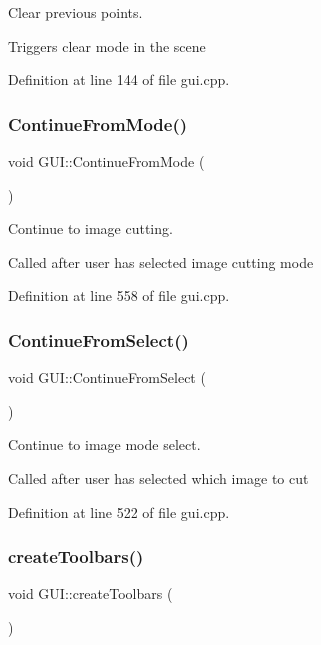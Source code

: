 Clear previous points. 

Triggers clear mode in the scene 

Definition at line 144 of file gui.\+cpp.

\mbox{\label{classGUI_a3547730e0fae81b59fcb19d00a370782}} 
\subsubsection{\texorpdfstring{Continue\+From\+Mode()}{ContinueFromMode()}}
{\footnotesize\ttfamily void G\+U\+I\+::\+Continue\+From\+Mode (\begin{DoxyParamCaption}{ }\end{DoxyParamCaption})}



Continue to image cutting. 

Called after user has selected image cutting mode 

Definition at line 558 of file gui.\+cpp.

\mbox{\label{classGUI_a0cddf3859f457495040857f4868f32e3}} 
\subsubsection{\texorpdfstring{Continue\+From\+Select()}{ContinueFromSelect()}}
{\footnotesize\ttfamily void G\+U\+I\+::\+Continue\+From\+Select (\begin{DoxyParamCaption}{ }\end{DoxyParamCaption})}



Continue to image mode select. 

Called after user has selected which image to cut 

Definition at line 522 of file gui.\+cpp.

\mbox{\label{classGUI_a26cdc4a989f3637301f0afb9cc5e23b0}} 
\subsubsection{\texorpdfstring{create\+Toolbars()}{createToolbars()}}
{\footnotesize\ttfamily void G\+U\+I\+::create\+Toolbars (\begin{DoxyParamCaption}{ }\end{DoxyParamCaption})}



